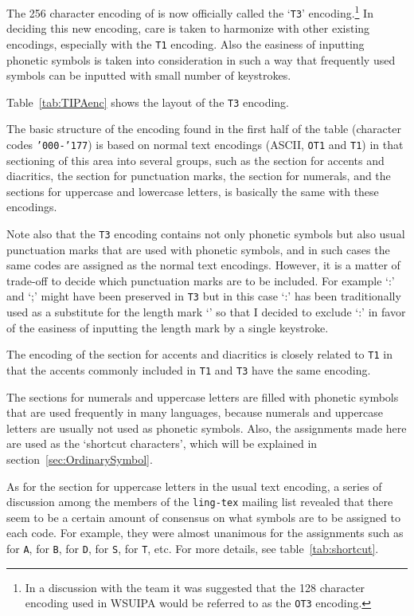 The 256 character encoding of \tipa{} is now officially called the
`\texttt{T3}' encoding.\footnote{In a discussion with the \LaTeXe{}
  team it was suggested that the 128 character encoding used in WSUIPA
  would be referred to as the \texttt{OT3} encoding.} In deciding this
new encoding, care is taken to harmonize with other existing 
encodings, especially with the \texttt{T1} encoding. Also the easiness
of inputting phonetic symbols is taken into consideration in such a
way that frequently used symbols can be inputted with small number of
keystrokes.

Table~\ref{tab:TIPAenc} shows the layout of the \texttt{T3} encoding.

The basic structure of the encoding found in the first half of the
table (character codes \texttt{'000-'177}) is based on normal text
encodings (ASCII, \texttt{OT1} and \texttt{T1}) in that sectioning of
this area into several groups, such as the section for accents and
diacritics, the section for punctuation marks, the section for
numerals, and the sections for uppercase and lowercase letters, is
basically the same with these encodings.

Note also that the \texttt{T3} encoding contains not only phonetic
symbols but also usual punctuation marks that are used with phonetic
symbols, and in such cases the same codes are assigned as the normal
text encodings. However, it is a matter of trade-off to decide which
punctuation marks are to be included. For example `:' and `;' might
have been preserved in \texttt{T3} but in this case `:' has been
traditionally used as a substitute for the length mark `\textipa{:}' so
that I decided to exclude `:' in favor of the easiness of inputting the
length mark by a single keystroke.

The encoding of the section for accents and diacritics is closely
related to \texttt{T1} in that the accents commonly included in
\texttt{T1} and \texttt{T3} have the same encoding.

The sections for numerals and uppercase letters are filled with
phonetic symbols that are used frequently in many languages, because
numerals and uppercase letters are usually not used as phonetic
symbols. Also, the assignments made here are used as the `shortcut
characters', which will be explained in section~\ref{sec:OrdinarySymbol}.

As for the section for uppercase letters in the usual text encoding, a
series of discussion among the members of the \texttt{ling-tex}
mailing list revealed that there seem to be a certain amount of
consensus on what symbols are to be assigned to each code. For example,
they were almost unanimous for the assignments such as  for
\texttt{A},  for \texttt{B},  for \texttt{D},
 for \texttt{S},  for \texttt{T}, etc. For more
details, see table~\ref{tab:shortcut}.

